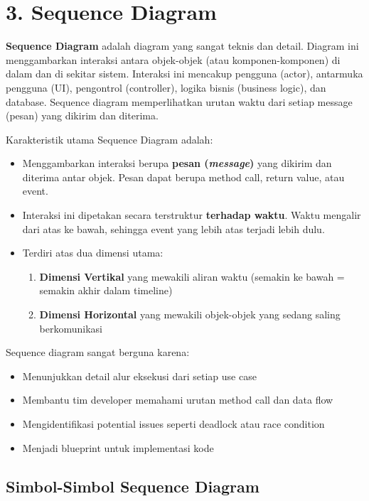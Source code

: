 \documentclass[12pt,a4paper]{article}
\begin{document}
\newpage
\section{3. Sequence Diagram}

\textbf{Sequence Diagram} adalah diagram yang sangat teknis dan detail. Diagram ini menggambarkan interaksi antara objek-objek (atau komponen-komponen) di dalam dan di sekitar sistem. Interaksi ini mencakup pengguna (actor), antarmuka pengguna (UI), pengontrol (controller), logika bisnis (business logic), dan database. Sequence diagram memperlihatkan urutan waktu dari setiap message (pesan) yang dikirim dan diterima.

Karakteristik utama Sequence Diagram adalah:

\begin{itemize}
    \item Menggambarkan interaksi berupa \textbf{pesan (\textit{message})} yang dikirim dan diterima antar objek. Pesan dapat berupa method call, return value, atau event.
    
    \item Interaksi ini dipetakan secara terstruktur \textbf{terhadap waktu}. Waktu mengalir dari atas ke bawah, sehingga event yang lebih atas terjadi lebih dulu.
    
    \item Terdiri atas dua dimensi utama: 
    \begin{enumerate}[label=(\arabic*)]
        \item \textbf{Dimensi Vertikal} yang mewakili aliran waktu (semakin ke bawah = semakin akhir dalam timeline)
        \item \textbf{Dimensi Horizontal} yang mewakili objek-objek yang sedang saling berkomunikasi
    \end{enumerate}
\end{itemize}

Sequence diagram sangat berguna karena:
\begin{itemize}
    \item Menunjukkan detail alur eksekusi dari setiap use case
    \item Membantu tim developer memahami urutan method call dan data flow
    \item Mengidentifikasi potential issues seperti deadlock atau race condition
    \item Menjadi blueprint untuk implementasi kode
\end{itemize}

\subsection{Simbol-Simbol Sequence Diagram}
\end{document}
